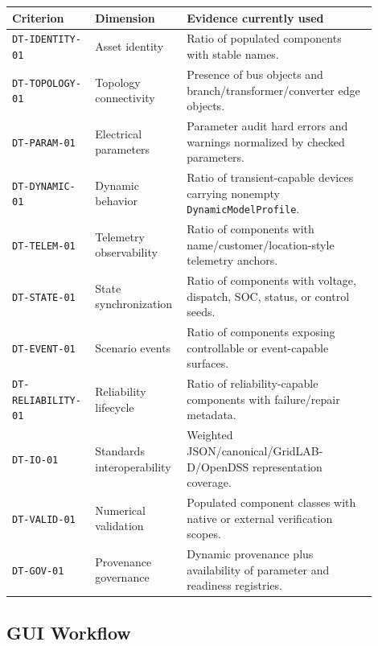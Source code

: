 \begin{longtable}{L{0.18\linewidth}L{0.22\linewidth}L{0.50\linewidth}}
\toprule
Criterion & Dimension & Evidence currently used \\
\midrule
\endhead
\texttt{DT-IDENTITY-01} & Asset identity & Ratio of populated components with stable names. \\
\texttt{DT-TOPOLOGY-01} & Topology connectivity & Presence of bus objects and branch/transformer/converter edge objects. \\
\texttt{DT-PARAM-01} & Electrical parameters & Parameter audit hard errors and warnings normalized by checked parameters. \\
\texttt{DT-DYNAMIC-01} & Dynamic behavior & Ratio of transient-capable devices carrying nonempty \texttt{DynamicModelProfile}. \\
\texttt{DT-TELEM-01} & Telemetry observability & Ratio of components with name/customer/location-style telemetry anchors. \\
\texttt{DT-STATE-01} & State synchronization & Ratio of components with voltage, dispatch, SOC, status, or control seeds. \\
\texttt{DT-EVENT-01} & Scenario events & Ratio of components exposing controllable or event-capable surfaces. \\
\texttt{DT-RELIABILITY-01} & Reliability lifecycle & Ratio of reliability-capable components with failure/repair metadata. \\
\texttt{DT-IO-01} & Standards interoperability & Weighted JSON/canonical/GridLAB-D/OpenDSS representation coverage. \\
\texttt{DT-VALID-01} & Numerical validation & Populated component classes with native or external verification scopes. \\
\texttt{DT-GOV-01} & Provenance governance & Dynamic provenance plus availability of parameter and readiness registries. \\
\bottomrule
\end{longtable}

\subsection{GUI Workflow}

